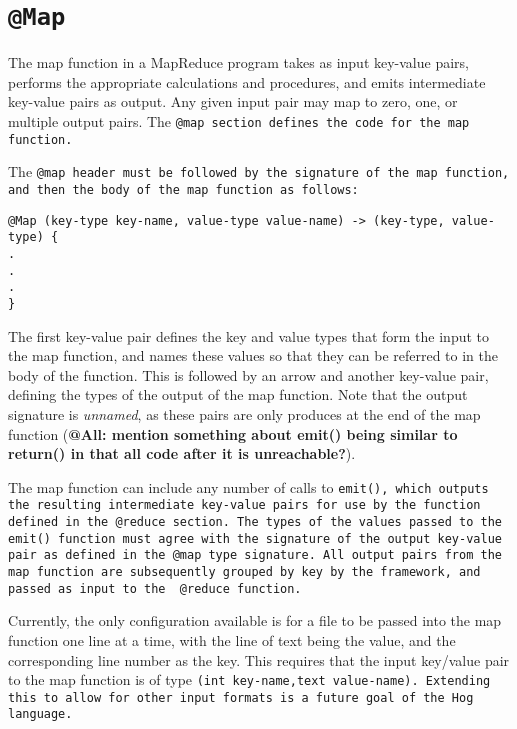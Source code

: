 \documentclass{book}
\begin{document}

\section{\tt @Map \rm} %
\label{sec:tt_map_rm}

The map function in a MapReduce program takes as input key-value pairs, performs
the appropriate calculations and procedures, and emits intermediate key-value pairs
as output. Any given input pair may map to zero, one, or multiple output pairs. The
\tt @map \rm section defines the code for the map function.

The \tt @map \rm header must be followed by the signature of the map function, and
then the body of the map function as follows:

\begin{verbatim}
@Map (key-type key-name, value-type value-name) -> (key-type, value-type) {
.
.
.
}
\end{verbatim}

The first key-value pair defines the key and value types that form the input to the
map function, and names these values so that they can be referred to in the body of
the function. This is followed by an arrow and another key-value pair, defining the
types of the output of the map function. Note that the output signature is
\emph{unnamed}, as these pairs are only produces at the end of the map function
(\textbf{@All: mention something about emit() being similar to return() in that all
code after it is unreachable?}).

The map function can include any number of calls to \tt emit()\rm, which outputs
the resulting intermediate key-value pairs for use by the function defined in the
\tt @reduce \rm section. The types of the values passed to the \tt emit() \rm
function must agree with the signature of the output key-value pair as defined in
the \tt @map \rm type signature. All output pairs from the map function are
subsequently grouped by key by the framework, and passed as input to the \tt
@reduce \rm function.

Currently, the only configuration available is for a file to be passed into the map
function one line at a time, with the line of text being the value, and the
corresponding line number as the key. This requires that the input key/value pair
to the map function is of type \tt (int key‐name,text value‐name)\rm. Extending
this to allow for other input formats is a future goal of the Hog language.
\end{document}
